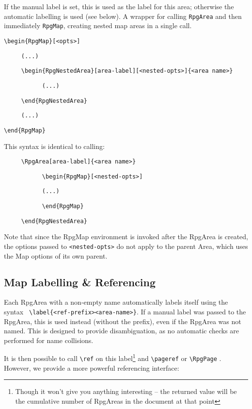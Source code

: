 \begin{macrolist}
{			If the manual label is set, this is used as the label for this area; otherwise the automatic labelling is used (see below).
		}
		{
			A wrapper for calling \verb|RpgArea| and then immediately \verb|RpgMap|, creating nested map areas in a single call.
		}
		{
			\verb|\begin{RpgMap}[<opts>]|

				\verb|     (...)|

				\quad\verb|     \begin{RpgNestedArea}[area-label][<nested-opts>]{<area name>}|

				\quad\quad\verb|           (...)|

				\quad\verb|     \end{RpgNestedArea}|		

				\verb|     (...)|
				
				\verb|\end{RpgMap}|		
		}{
			This syntax is identical to calling:

			\quad\verb|     \RpgArea[area-label]{<area name>}|

			\quad\quad\verb|           \begin{RpgMap}[<nested-opts>]|
			
			\quad	\quad\quad\verb|           (...)|

			\quad\quad\verb|           \end{RpgMap}|

			\quad\verb|     \end{RpgNestedArea}|	

			Note that since the RpgMap environment is invoked after the RpgArea is created, the options passed to \verb|<nested-opts>| do not apply to the parent Area, which uses the Map options of its own parent.
		}
		\end{macrolist}

		\subsection{Map Labelling \& Referencing}
		
			Each RpgArea with a non-empty name automatically labels itself using the syntax	\verb| \label{<ref-prefix><area-name>}|. If a manual label was passed to the RpgArea, this is used instead (without the prefix), even if the RpgArea was not named. This is designed to provide disambiguation, as no automatic checks are performed for name collisions. 

			It is then possible to call \verb|\ref| on this label\footnote{Though it won't give you anything interesting -- the returned value will be the cumulative number of RpgAreas in the document at that point} and \verb|\pageref| or \verb|\RpgPage| . However, we provide a more powerful referencing interface:

